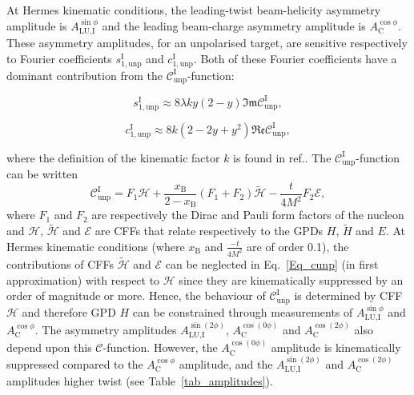 At H{\sc ermes} kinematic conditions, the leading-twist beam-helicity asymmetry amplitude is $A_{\textrm{LU,I}}^{\sin\phi}$ and the leading beam-charge asymmetry amplitude is $A^{\cos\phi}_{\textrm{C}}$. These asymmetry amplitudes, for an unpolarised target, are sensitive respectively to Fourier coefficients $s_{1,\textrm{unp}}^{\textrm{I}}$ and $c_{1,\textrm{unp}}^{\textrm{I}}$. Both of these Fourier coefficients have a dominant contribution from the $\mathcal{C}_{\textrm{unp}}^{\textrm{I}}$-function:
\begin{center}
\begin{equation}
 s_{1,\textrm{unp}}^{\textrm{I}} \approx 8\lambda ky(2-y)\mathfrak{Im}\mathcal{C}_{\textrm{unp}}^{\textrm{I}},
\label{eq:s1}
\end{equation}
\end{center}
\begin{center}
\begin{equation}
 c_{1,\textrm{unp}}^{\textrm{I}} \approx 8k(2- 2y + y^{2})\mathfrak{Re}\mathcal{C}_{\textrm{unp}}^{\textrm{I}},
\label{eq:c1}
\end{equation}
\end{center}
where the definition of the kinematic factor $k$ is found
  in ref.\cite{Bel02b}. The $\mathcal{C}_{\textrm{unp}}^{\textrm{I}}$-function can be
written
\cite{Bel02b} 
\begin{equation}
 \mathcal{C}_{\textrm{unp}}^{\textrm{I}} = F_{1}\mathcal{H} + \frac{x_{\textrm{B}}}{2-x_{\textrm{B}}}(F_{1}+F_{2})\widetilde{\mathcal{H}} -\frac{t}{4M^{2}}F_{2}\mathcal{E},
\label{Eq_cunp}
\end{equation}
where $F_{1}$ and $F_{2}$ are respectively the Dirac and Pauli form
factors of the nucleon and $\mathcal{H}$, $\widetilde{\mathcal{H}}$ and
$\mathcal{E}$ are CFFs that relate respectively to the GPDs $H$,
$\widetilde{H}$ and $E$.  At H{\sc ermes} kinematic
conditions (where $x_{\textrm{B}}$ and $\frac{-t}{4M^2}$ are of order 0.1), the
contributions of CFFs $\widetilde{\mathcal{H}}$ and $\mathcal{E}$ can be
neglected in Eq.~\ref{Eq_cunp} (in first approximation) with respect to $\mathcal{H}$ since they
are kinematically suppressed by an order of magnitude or more.
Hence, the behaviour of
$\mathcal{C}_{\textrm{unp}}^{\textrm{I}}$ is determined by CFF $\mathcal{H}$
and therefore GPD $H$ can be constrained through
measurements of $A_{\textrm{LU,I}}^{\sin\phi}$ and $A^{\cos\phi}_{\textrm{C}}$.
The asymmetry amplitudes $A_{\textrm{LU},\textrm{I}}^{\sin(2\phi)}$,
$A^{\cos(0\phi)}_{\textrm{C}}$ and $A^{\cos(2\phi)}_{\textrm{C}}$ also depend
upon this $\mathcal{C}$-function. However, the $A^{\cos(0\phi)}_{\textrm{C}}$ amplitude is kinematically suppressed compared to the $A^{\cos\phi}_{\textrm{C}}$ amplitude, and the  $A_{\textrm{LU,I}}^{\sin(2\phi)}$ and $A^{\cos(2\phi)}_{\textrm{C}}$ amplitudes  higher
twist  (see Table~\ref{tab_amplitudes}).

